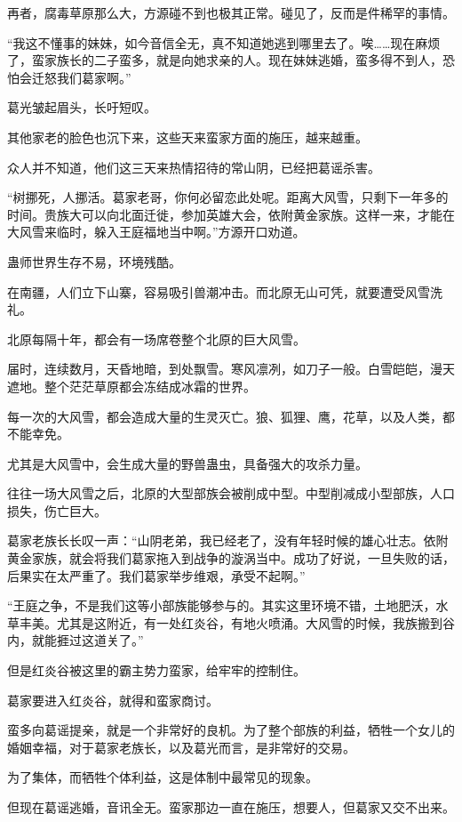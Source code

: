 \begin{this_body}
再者，腐毒草原那么大，方源碰不到也极其正常。碰见了，反而是件稀罕的事情。

“我这不懂事的妹妹，如今音信全无，真不知道她逃到哪里去了。唉……现在麻烦了，蛮家族长的二子蛮多，就是向她求亲的人。现在妹妹逃婚，蛮多得不到人，恐怕会迁怒我们葛家啊。”

葛光皱起眉头，长吁短叹。

其他家老的脸色也沉下来，这些天来蛮家方面的施压，越来越重。

众人并不知道，他们这三天来热情招待的常山阴，已经把葛谣杀害。

“树挪死，人挪活。葛家老哥，你何必留恋此处呢。距离大风雪，只剩下一年多的时间。贵族大可以向北面迁徙，参加英雄大会，依附黄金家族。这样一来，才能在大风雪来临时，躲入王庭福地当中啊。”方源开口劝道。

蛊师世界生存不易，环境残酷。

在南疆，人们立下山寨，容易吸引兽潮冲击。而北原无山可凭，就要遭受风雪洗礼。

北原每隔十年，都会有一场席卷整个北原的巨大风雪。

届时，连续数月，天昏地暗，到处飘雪。寒风凛冽，如刀子一般。白雪皑皑，漫天遮地。整个茫茫草原都会冻结成冰霜的世界。

每一次的大风雪，都会造成大量的生灵灭亡。狼、狐狸、鹰，花草，以及人类，都不能幸免。

尤其是大风雪中，会生成大量的野兽蛊虫，具备强大的攻杀力量。

往往一场大风雪之后，北原的大型部族会被削成中型。中型削减成小型部族，人口损失，伤亡巨大。

葛家老族长长叹一声：“山阴老弟，我已经老了，没有年轻时候的雄心壮志。依附黄金家族，就会将我们葛家拖入到战争的漩涡当中。成功了好说，一旦失败的话，后果实在太严重了。我们葛家举步维艰，承受不起啊。”

“王庭之争，不是我们这等小部族能够参与的。其实这里环境不错，土地肥沃，水草丰美。尤其是这附近，有一处红炎谷，有地火喷涌。大风雪的时候，我族搬到谷内，就能捱过这道关了。”

但是红炎谷被这里的霸主势力蛮家，给牢牢的控制住。

葛家要进入红炎谷，就得和蛮家商讨。

蛮多向葛谣提亲，就是一个非常好的良机。为了整个部族的利益，牺牲一个女儿的婚姻幸福，对于葛家老族长，以及葛光而言，是非常好的交易。

为了集体，而牺牲个体利益，这是体制中最常见的现象。

但现在葛谣逃婚，音讯全无。蛮家那边一直在施压，想要人，但葛家又交不出来。


\end{this_body}
